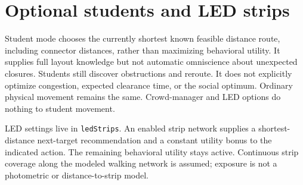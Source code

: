\documentclass[11pt]{article}
\begin{document}
\section{Optional students and LED strips}

Student mode chooses the currently shortest known feasible distance route, including connector distances, rather than maximizing behavioral utility. It supplies full layout knowledge but not automatic omniscience about unexpected closures. Students still discover obstructions and reroute. It does not explicitly optimize congestion, expected clearance time, or the social optimum. Ordinary physical movement remains the same. Crowd-manager and LED options do nothing to student movement.


LED settings live in \texttt{led\allowbreak{}Strips}. An enabled strip network supplies a shortest-distance next-target recommendation and a constant utility bonus to the indicated action. The remaining behavioral utility stays active. Continuous strip coverage along the modeled walking network is assumed; exposure is not a photometric or distance-to-strip model.
\end{document}
